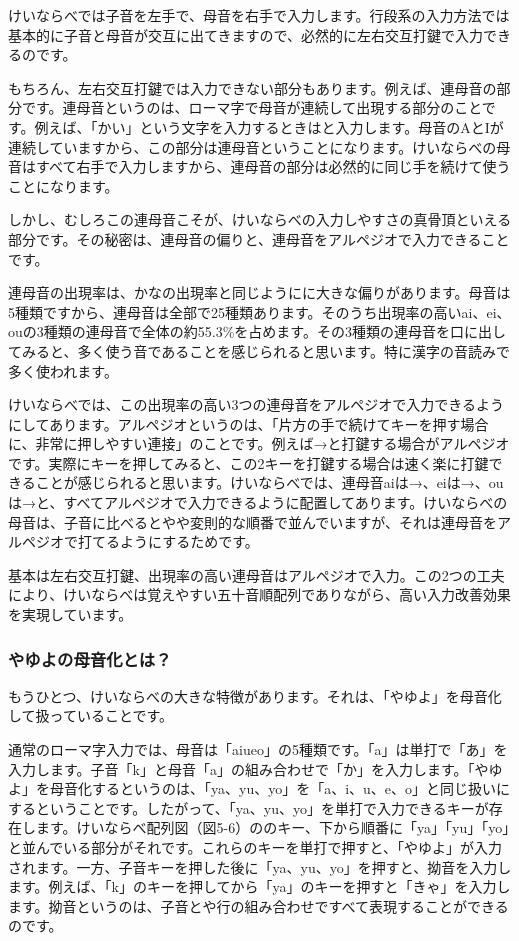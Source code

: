 けいならべでは子音を左手で、母音を右手で入力します。行段系の入力方法では基本的に子音と母音が交互に出てきますので、必然的に左右交互打鍵で入力できるのです。

もちろん、左右交互打鍵では入力できない部分もあります。例えば、連母音の部分です。連母音というのは、ローマ字で母音が連続して出現する部分のことです。例えば、「かい」という文字を入力するときはと入力します。母音のAとIが連続していますから、この部分は連母音ということになります。けいならべの母音はすべて右手で入力しますから、連母音の部分は必然的に同じ手を続けて使うことになります。

しかし、むしろこの連母音こそが、けいならべの入力しやすさの真骨頂といえる部分です。その秘密は、連母音の偏りと、連母音をアルペジオで入力できることです。

連母音の出現率は、かなの出現率と同じようにに大きな偏りがあります。母音は5種類ですから、連母音は全部で25種類あります。そのうち出現率の高いai、ei、ouの3種類の連母音で全体の約55.3\%を占めます。その3種類の連母音を口に出してみると、多く使う音であることを感じられると思います。特に漢字の音読みで多く使われます。

けいならべでは、この出現率の高い3つの連母音をアルペジオで入力できるようにしてあります。アルペジオというのは、「片方の手で続けてキーを押す場合に、非常に押しやすい連接」のことです。例えば→と打鍵する場合がアルペジオです。実際にキーを押してみると、この2キーを打鍵する場合は速く楽に打鍵できることが感じられると思います。けいならべでは、連母音aiは→、eiは→、ouは→と、すべてアルペジオで入力できるように配置してあります。けいならべの母音は、子音に比べるとやや変則的な順番で並んでいますが、それは連母音をアルペジオで打てるようにするためです。

基本は左右交互打鍵、出現率の高い連母音はアルペジオで入力。この2つの工夫により、けいならべは覚えやすい五十音順配列でありながら、高い入力改善効果を実現しています。

\subsubsection*{やゆよの母音化とは？}

もうひとつ、けいならべの大きな特徴があります。それは、「やゆよ」を母音化して扱っていることです。

通常のローマ字入力では、母音は「aiueo」の5種類です。「a」は単打で「あ」を入力します。子音「k」と母音「a」の組み合わせで「か」を入力します。「やゆよ」を母音化するというのは、「ya、yu、yo」を「a、i、u、e、o」と同じ扱いにするということです。したがって、「ya、yu、yo」を単打で入力できるキーが存在します。けいならべ配列図（図5-6）ののキー、下から順番に「ya」「yu」「yo」と並んでいる部分がそれです。これらのキーを単打で押すと、「やゆよ」が入力されます。一方、子音キーを押した後に「ya、yu、yo」を押すと、拗音を入力します。例えば、「k」のキーを押してから「ya」のキーを押すと「きゃ」を入力します。拗音というのは、子音とや行の組み合わせですべて表現することができるのです。


